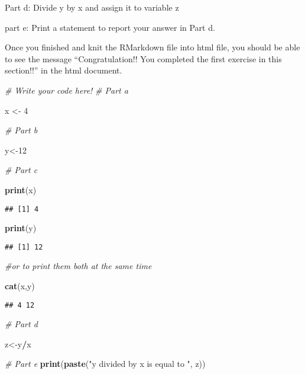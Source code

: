 \documentclass[
]{article}
\newenvironment{Shaded}{\begin{snugshade}}{\end{snugshade}}
\newcommand{\CommentTok}[1]{\textcolor[rgb]{0.56,0.35,0.01}{\textit{#1}}}
\newcommand{\DecValTok}[1]{\textcolor[rgb]{0.00,0.00,0.81}{#1}}
\newcommand{\FunctionTok}[1]{\textcolor[rgb]{0.13,0.29,0.53}{\textbf{#1}}}
\newcommand{\NormalTok}[1]{#1}
\newcommand{\OtherTok}[1]{\textcolor[rgb]{0.56,0.35,0.01}{#1}}
\newcommand{\SpecialCharTok}[1]{\textcolor[rgb]{0.81,0.36,0.00}{\textbf{#1}}}
\newcommand{\StringTok}[1]{\textcolor[rgb]{0.31,0.60,0.02}{#1}}
\begin{document}
Part d: Divide y by x and assign it to variable z

part e: Print a statement to report your answer in Part d.

Once you finished and knit the RMarkdown file into html file, you should
be able to see the message ``Congratulation!! You completed the first
exercise in this section!!'' in the html document.

\begin{Shaded}
\begin{Highlighting}[]
\CommentTok{\# Write your code here!}
\CommentTok{\# Part a}

\NormalTok{x }\OtherTok{\textless{}{-}} \DecValTok{4}

\CommentTok{\# Part b}

\NormalTok{y}\OtherTok{\textless{}{-}}\DecValTok{12}

\CommentTok{\# Part c}

\FunctionTok{print}\NormalTok{(x)}
\end{Highlighting}
\end{Shaded}

\begin{verbatim}
## [1] 4
\end{verbatim}

\begin{Shaded}
\begin{Highlighting}[]
\FunctionTok{print}\NormalTok{(y)}
\end{Highlighting}
\end{Shaded}

\begin{verbatim}
## [1] 12
\end{verbatim}

\begin{Shaded}
\begin{Highlighting}[]
\CommentTok{\#or to print them both at the same time}

\FunctionTok{cat}\NormalTok{(x,y)}
\end{Highlighting}
\end{Shaded}

\begin{verbatim}
## 4 12
\end{verbatim}

\begin{Shaded}
\begin{Highlighting}[]
\CommentTok{\# Part d}

\NormalTok{z}\OtherTok{\textless{}{-}}\NormalTok{y}\SpecialCharTok{/}\NormalTok{x}

\CommentTok{\# Part e}
\FunctionTok{print}\NormalTok{(}\FunctionTok{paste}\NormalTok{(}\StringTok{"y divided by x is equal to "}\NormalTok{, z))}
\end{Highlighting}
\end{Shaded}
\end{document}
